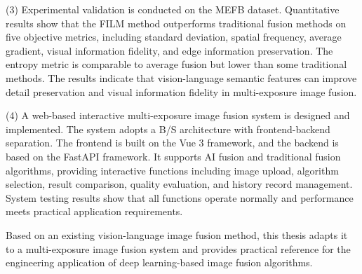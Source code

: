\begin{abstractEn}
(3) Experimental validation is conducted on the MEFB dataset. Quantitative results show that the FILM method outperforms traditional fusion methods on five objective metrics, including standard deviation, spatial frequency, average gradient, visual information fidelity, and edge information preservation. The entropy metric is comparable to average fusion but lower than some traditional methods. The results indicate that vision-language semantic features can improve detail preservation and visual information fidelity in multi-exposure image fusion.

(4) A web-based interactive multi-exposure image fusion system is designed and implemented. The system adopts a B/S architecture with frontend-backend separation. The frontend is built on the Vue 3 framework, and the backend is based on the FastAPI framework. It supports AI fusion and traditional fusion algorithms, providing interactive functions including image upload, algorithm selection, result comparison, quality evaluation, and history record management. System testing results show that all functions operate normally and performance meets practical application requirements.

Based on an existing vision-language image fusion method, this thesis adapts it to a multi-exposure image fusion system and provides practical reference for the engineering application of deep learning-based image fusion algorithms.
\end{abstractEn}
